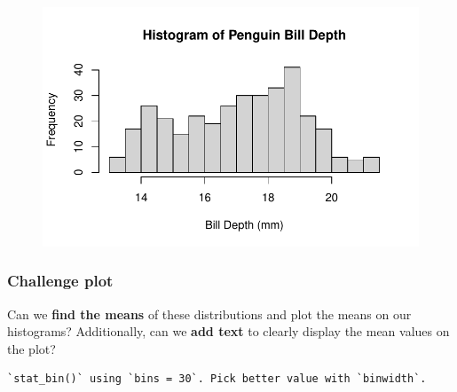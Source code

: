 \documentclass[
  letterpaper,
  DIV=11,
  numbers=noendperiod]{scrreprt}
\newenvironment{Shaded}{\begin{snugshade}}{\end{snugshade}}
\newcommand{\AttributeTok}[1]{\textcolor[rgb]{0.40,0.45,0.13}{#1}}
\newcommand{\CommentTok}[1]{\textcolor[rgb]{0.37,0.37,0.37}{#1}}
\newcommand{\DecValTok}[1]{\textcolor[rgb]{0.68,0.00,0.00}{#1}}
\newcommand{\FunctionTok}[1]{\textcolor[rgb]{0.28,0.35,0.67}{#1}}
\newcommand{\NormalTok}[1]{\textcolor[rgb]{0.00,0.23,0.31}{#1}}
\newcommand{\SpecialCharTok}[1]{\textcolor[rgb]{0.37,0.37,0.37}{#1}}
\newcommand{\StringTok}[1]{\textcolor[rgb]{0.13,0.47,0.30}{#1}}
\begin{document}
\begin{tcolorbox}
\begin{Shaded}
\end{Shaded}

\begin{figure}[H]

{\centering \includegraphics{scripts/02_dataViz/class4_files/figure-pdf/widths-1.pdf}

}

\end{figure}

\end{tcolorbox}

\hypertarget{challenge-plot}{%
\subsubsection{Challenge plot}\label{challenge-plot}}

Can we \textbf{find the means} of these distributions and plot the means
on our histograms? Additionally, can we \textbf{add text} to clearly
display the mean values on the plot?

\begin{verbatim}
`stat_bin()` using `bins = 30`. Pick better value with `binwidth`.
\end{verbatim}
\end{document}
